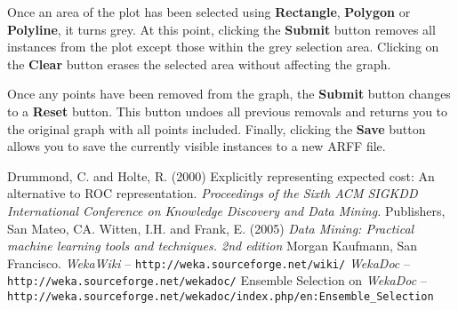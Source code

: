 \documentclass[a4paper]{article}
\begin{document}
Once an area of the plot has been selected using \textbf{Rectangle},
\textbf{Polygon} or \textbf{Polyline}, it turns grey.  At this point, clicking
the \textbf{Submit} button removes all instances from the plot except those
within the grey selection area.  Clicking on the \textbf{Clear} button erases
the selected area without affecting the graph.

Once any points have been removed from the graph, the \textbf{Submit} button
changes to a \textbf{Reset} button.  This button undoes all previous removals
and returns you to the original graph with all points included.  Finally,
clicking the \textbf{Save} button allows you to save the currently visible
instances to a new ARFF file.

\newpage

\begin{thebibliography}{999}
    Drummond, C. and Holte, R. (2000) Explicitly representing expected cost: An alternative to ROC representation. \textit{Proceedings of the Sixth ACM SIGKDD International Conference on Knowledge Discovery and Data Mining.}
Publishers, San Mateo, CA.
	 Witten, I.H. and Frank, E. (2005) \textit{Data Mining: Practical machine
learning tools and techniques. 2nd edition}  Morgan Kaufmann, San
Francisco.
	 \textit{WekaWiki} -- \texttt{http://weka.sourceforge.net/wiki/}
	 \textit{WekaDoc} -- \texttt{http://weka.sourceforge.net/wekadoc/}
	 Ensemble Selection on \textit{WekaDoc} -- \\ \small{\texttt{http://weka.sourceforge.net/wekadoc/index.php/en:Ensemble\_Selection}}
\end{thebibliography}
\end{document}
